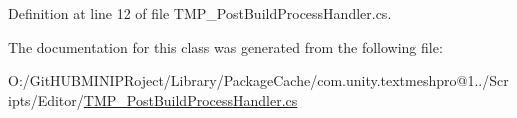Definition at line 12 of file T\+M\+P\+\_\+\+Post\+Build\+Process\+Handler.\+cs.



The documentation for this class was generated from the following file\+:\begin{DoxyCompactItemize}
\item 
O\+:/\+Git\+H\+U\+B\+M\+I\+N\+I\+P\+Roject/\+Library/\+Package\+Cache/com.\+unity.\+textmeshpro@1../\+Scripts/\+Editor/\mbox{\hyperlink{_t_m_p___post_build_process_handler_8cs}{T\+M\+P\+\_\+\+Post\+Build\+Process\+Handler.\+cs}}\end{DoxyCompactItemize}
